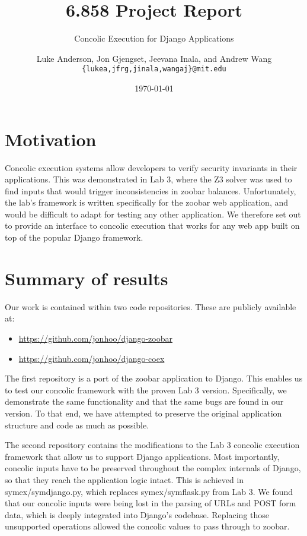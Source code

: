 \documentclass{scrartcl}
\author{
Luke Anderson, Jon Gjengset, Jeevana Inala, and Andrew Wang \\
\texttt{\{lukea,jfrg,jinala,wangaj\}@mit.edu}
}
\title{6.858 Project Report}
\subtitle{Concolic Execution for Django Applications}
\date{\today}
\begin{document}
\maketitle


\section{Motivation}

Concolic execution systems allow developers to verify security
invariants in their applications. This was demonstrated in Lab 3,
where the Z3 solver was used to find inputs that would trigger
inconsistencies in zoobar balances. Unfortunately, the lab's
framework is written specifically for the zoobar web application, and
would be difficult to adapt for testing any other application. We
therefore set out to provide an interface to concolic execution that
works for any web app built on top of the popular Django framework.


\section{Summary of results}

Our work is contained within two code repositories. These are
publicly available at:
\begin{itemize}
\item \url{https://github.com/jonhoo/django-zoobar}
\item \url{https://github.com/jonhoo/django-coex}
\end{itemize}

The first repository is a port of the zoobar application to Django.
This enables us to test our concolic framework with the proven Lab 3
version. Specifically, we demonstrate the same functionality and that
the same bugs are found in our version. To that end, we have attempted
to preserve the original application structure and code as much as
possible.

The second repository contains the modifications to the Lab 3 concolic
execution framework that allow us to support Django applications. Most
importantly, concolic inputs have to be preserved throughout the
complex internals of Django, so that they reach the application logic
intact. This is achieved in symex/symdjango.py, which replaces
symex/symflask.py from Lab 3. We found that our concolic inputs were
being lost in the parsing of URLs and POST form data, which is deeply
integrated into Django's codebase. Replacing those unsupported
operations allowed the concolic values to pass through to zoobar.
\end{document}
